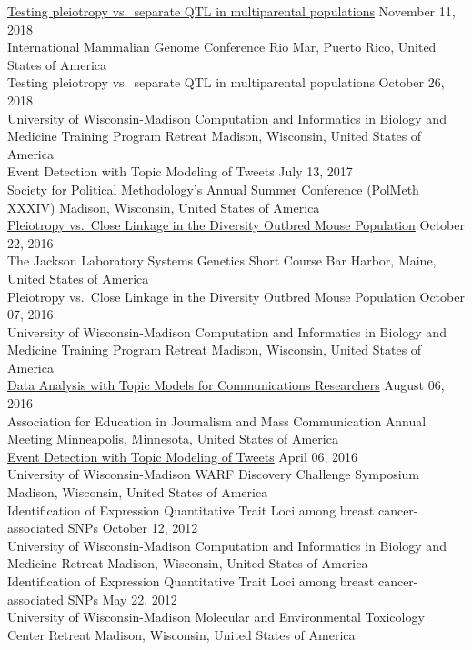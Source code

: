 \documentclass[
  10pt,
]
{article}
\begin{document}
\normalsize \href{https://github.com/fboehm/imgc2018poster}{Testing
pleiotropy vs.~separate QTL in multiparental populations}
\hfill November 11, 2018\\
International Mammalian Genome Conference \hfill Rio Mar, Puerto Rico,
United States of America\\
\normalsize Testing pleiotropy vs.~separate QTL in multiparental
populations \hfill October 26, 2018\\
University of Wisconsin-Madison Computation and Informatics in Biology
and Medicine Training Program Retreat \hfill Madison, Wisconsin, United
States of America\\
\normalsize Event Detection with Topic Modeling of Tweets \hfill July
13, 2017\\
Society for Political Methodology's Annual Summer Conference (PolMeth
XXXIV) \hfill Madison, Wisconsin, United States of America\\
\normalsize \href{https://figshare.com/articles/Pleiotropy_vs_Close_Linkage_in_the_Diversity_Outbred_Mouse_Population/4284338}{Pleiotropy
vs.~Close Linkage in the Diversity Outbred Mouse Population}
\hfill October 22, 2016\\
The Jackson Laboratory Systems Genetics Short Course \hfill Bar Harbor,
Maine, United States of America\\
\normalsize Pleiotropy vs.~Close Linkage in the Diversity Outbred Mouse
Population \hfill October 07, 2016\\
University of Wisconsin-Madison Computation and Informatics in Biology
and Medicine Training Program Retreat \hfill Madison, Wisconsin, United
States of America\\
\normalsize \href{https://figshare.com/articles/Data_Analysis_with_Topic_Models_for_Communications_Researchers/3545462}{Data
Analysis with Topic Models for Communications Researchers} \hfill August
06, 2016\\
Association for Education in Journalism and Mass Communication Annual
Meeting \hfill Minneapolis, Minnesota, United States of America\\
\normalsize \href{https://figshare.com/articles/Event_Detection_with_Topic_Modeling_of_Tweets/3545468}{Event
Detection with Topic Modeling of Tweets} \hfill April 06, 2016\\
University of Wisconsin-Madison WARF Discovery Challenge Symposium
\hfill Madison, Wisconsin, United States of America\\
\normalsize Identification of Expression Quantitative Trait Loci among
breast cancer-associated SNPs \hfill October 12, 2012\\
University of Wisconsin-Madison Computation and Informatics in Biology
and Medicine Retreat \hfill Madison, Wisconsin, United States of
America\\
\normalsize Identification of Expression Quantitative Trait Loci among
breast cancer-associated SNPs \hfill May 22, 2012\\
University of Wisconsin-Madison Molecular and Environmental Toxicology
Center Retreat \hfill Madison, Wisconsin, United States of America
\end{document}
